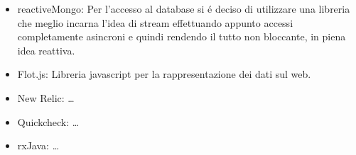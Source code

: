 \begin{itemize}
 \item {reactiveMongo:} Per l'accesso al database si \'e deciso di utilizzare una libreria che meglio incarna l'idea di stream effettuando appunto accessi completamente asincroni e quindi rendendo il tutto non bloccante, in piena idea reattiva.\cite{ReactiveMongo}
 \item {Flot.js:} Libreria javascript per la rappresentazione dei dati sul web. \cite{FlotJS}
 \item {New Relic:} \ldots
 \item {Quickcheck:} \ldots
 \item {rxJava:} \ldots \cite{RxJava}
\end{itemize}

